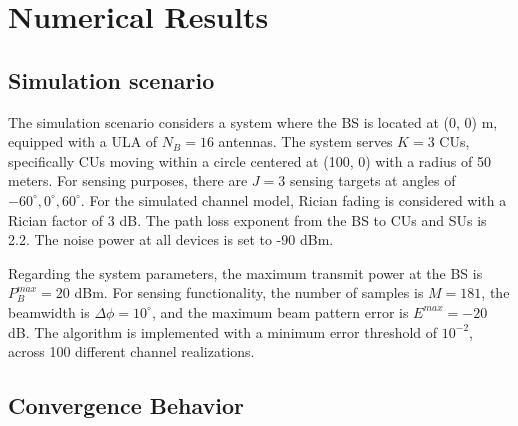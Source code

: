 \documentclass[runningheads]{llncs}
\begin{document}
\section{Numerical Results}
\subsection{Simulation scenario}
The simulation scenario considers a system where the BS is located at (0, 0) m, equipped with a ULA of $N_B=16$ antennas. 
The system serves $K = 3$ CUs, specifically CUs moving within a circle centered at (100, 0) with a radius of 50 meters. For sensing purposes, there are $J=3$ sensing targets at angles of $-60^{\circ}, 0^{\circ}, 60^{\circ}$. For the simulated channel model, Rician fading is considered with a Rician factor of 3 dB. The path loss exponent from the BS to CUs and SUs is 2.2. The noise power at all devices is set to -90 dBm. 

Regarding the system parameters, the maximum transmit power at the BS is $P_B^{max} = 20$ dBm. For sensing functionality, the number of samples is $M=181$, the beamwidth is $\Delta \phi =10 ^\circ$, and the maximum beam pattern error is $E^{max} = -20$ dB. The algorithm is implemented with a minimum error threshold of $10^{-2}$, across 100 different channel realizations. 

\subsection{Convergence Behavior} 

\end{document}
